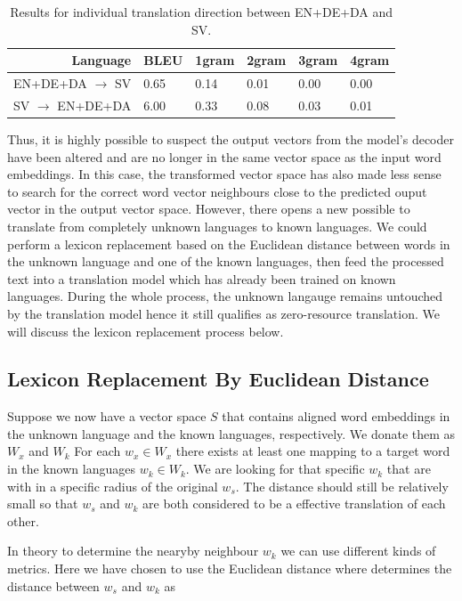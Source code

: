 \documentclass[thesis,fonts=libertine]{cluu}
\begin{document}
\begin{table}
  \centering
  \begin{tabular}{|r*{5}{|l}|}
  \hline
  Language & BLEU & 1gram & 2gram & 3gram & 4gram \\ [0.25ex]
  \hline\hline
  EN+DE+DA $\rightarrow$ SV & 0.65 & 0.14 & 0.01 & 0.00 & 0.00 \\
  \hline
  SV $\rightarrow$ EN+DE+DA & 6.00 & 0.33 & 0.08 & 0.03 & 0.01 \\
  \hline
  \end{tabular}
  \caption{Results for individual translation direction between EN+DE+DA and SV.}
  \label{table:directional_results}
\end{table}

Thus, it is highly possible to suspect the output vectors from the model's decoder have been altered and are no longer in the same vector space as the input word embeddings. In this case, the transformed vector space has also made less sense to search for the correct word vector neighbours close to the predicted ouput vector in the output vector space. However, there opens a new possible to translate from completely unknown languages to known languages. We could perform a lexicon replacement based on the Euclidean distance between words in the unknown language and one of the known languages, then feed the processed text into a translation model which has already been trained on known languages. During the whole process, the unknown langauge remains untouched by the translation model hence it still qualifies as zero-resource translation. We will discuss the lexicon replacement process below.

\subsection{Lexicon Replacement By Euclidean Distance}

Suppose we now have a vector space $S$ that contains aligned word embeddings in the unknown language and the known languages, respectively. We donate them as $W_x$ and $W_k$ For each $w_x\in W_x$ there exists at least one mapping to a target word in the known languages $w_k \in W_k$. We are looking for that specific $w_k$ that are with in a specific radius of the original $w_s$. The distance should still be relatively small so that $w_s$ and $w_k$ are both considered to be a effective translation of each other.

In theory to determine the nearyby neighbour $w_k$ we can use different kinds of metrics. Here we have chosen to use the Euclidean distance where determines the distance between $w_s$ and $w_k$ as
\end{document}
